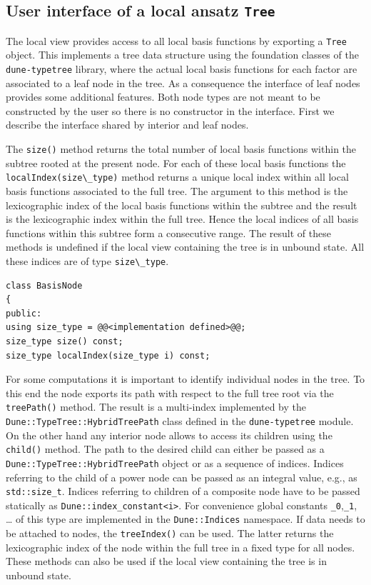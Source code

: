\documentclass[a4paper,10pt,headings=normal,bibliography=totoc]{scrartcl}
\newcommand{\cpp}[1]{\lstinline[basicstyle=\ttfamily]!#1!}
\newcommand{\dunemodule}[1]{\texttt{#1}}
\begin{document}
\subsection{User interface of a local ansatz \texorpdfstring{\cpp{Tree}}{Tree}}
The local view provides access to all local basis functions
by exporting a \cpp{Tree} object. This implements a tree
data structure using the foundation classes of the
\dunemodule{dune-typetree} library, where the actual local basis
functions for each factor are associated to a leaf node
in the tree. As a consequence the interface of leaf nodes
provides some additional features.
Both node types are not meant to be constructed by the
user so there is no constructor in the interface.
First we describe the interface shared by interior
and leaf nodes.

The \cpp{size()} method returns the total number of
local basis functions within the subtree rooted at the
present node. For each of these local basis functions
the \cpp{localIndex(size\_type)} method returns a unique
local index within all local basis functions associated to the full
tree. The argument to this method is the lexicographic
index of the local basis functions within the subtree
and the result is the lexicographic index within the full
tree. Hence the local indices of all basis functions
within this subtree form a consecutive range.
The result of these methods is undefined if the
local view containing the tree is in unbound state.
All these indices are of type \cpp{size\_type}.

\begin{lstlisting}[style=Interface]
class BasisNode
{
public:
using size_type = @@<implementation defined>@@;
size_type size() const;
size_type localIndex(size_type i) const;
\end{lstlisting}

For some computations it is important to identify
individual nodes in the tree. To this end the node
exports its path with respect to the full tree root
via the \cpp{treePath()} method.
The result is a multi-index
implemented by the \cpp{Dune::TypeTree::HybridTreePath}
class defined in the \dunemodule{dune-typetree} module.
On the other hand any interior node allows to access
its children using the \cpp{child()} method.
The path to the desired child can either be passed
as a \cpp{Dune::TypeTree::HybridTreePath} object
or as a sequence of indices. Indices referring
to the child of a power node can be passed as
an integral value, e.g., as \cpp{std::size_t}.
Indices referring to children of a composite node
have to be passed statically as \cpp{Dune::index_constant<i>}.
For convenience global constants \cpp{_0},\cpp{_1}, \dots
of this type are implemented in the \cpp{Dune::Indices}
namespace.
If data needs to be attached to nodes,
the \cpp{treeIndex()} can be used. The latter returns
the lexicographic index of the node within the full
tree in a fixed type for all nodes.
These methods can also be used if the local view containing
the tree is in unbound state.
\end{document}

